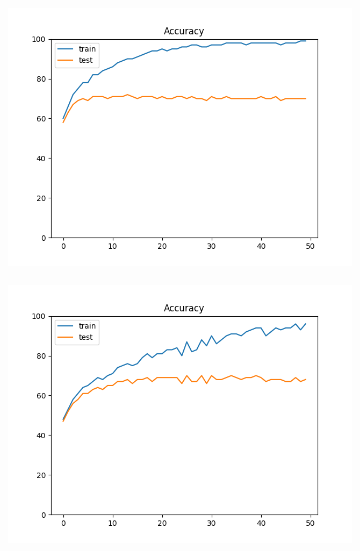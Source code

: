 \documentclass[12pt]{article}
\begin{document}
\begin{figure}
\begin{subfigure}{0.16\textwidth}
    \includegraphics[width=\linewidth]{accuracies_2_3_bs32.png}
  \end{subfigure}
  \begin{subfigure}{0.16\textwidth}
    \centering
    \includegraphics[width=\linewidth]{accuracies_2_3_bs256.png}
  \end{subfigure}


\end{figure}
\end{document}
